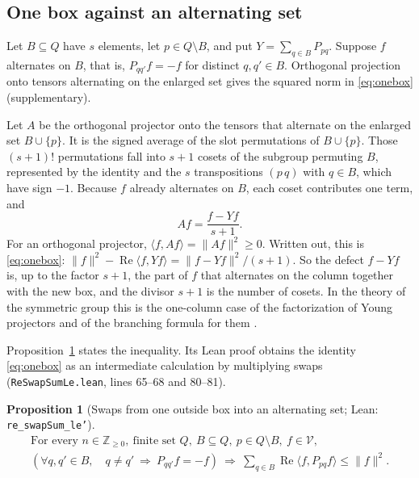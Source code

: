 \documentclass[11pt]{amsart}
\newcommand{\lean}[1]{\texttt{#1}}
\newcommand{\notlean}{supplementary}
\newtheorem{proposition}{Proposition}
\theoremstyle{definition}
\theoremstyle{remark}
\begin{document}
\subsection{One box against an alternating set}\label{sec:onebox}

Let \(B\subseteq Q\) have \(s\) elements, let \(p\in Q\setminus B\), and put
\(Y=\sum_{q\in B}P_{pq}\). Suppose \(f\) alternates on \(B\), that is,
\(P_{qq'}f=-f\) for distinct \(q,q'\in B\). Orthogonal projection onto tensors alternating on the enlarged set
gives the squared norm in \eqref{eq:onebox} (\notlean).

Let \(A\) be the orthogonal projector onto the tensors that alternate on the
enlarged set \(B\cup\{p\}\). It is the signed average of the slot
permutations of \(B\cup\{p\}\). Those \((s+1)!\) permutations fall into
\(s+1\) cosets of the subgroup permuting \(B\), represented by the identity
and the \(s\) transpositions \((p\,q)\) with \(q\in B\), which have sign
\(-1\). Because \(f\) already alternates on \(B\), each coset contributes one
term, and
\[
Af=\frac{f-Yf}{s+1}.
\]
For an orthogonal projector, \(\langle f,Af\rangle=\|Af\|^2\ge0\). Written
out, this is \eqref{eq:onebox}:
\(\|f\|^2-\operatorname{Re}\langle f,Yf\rangle=\|f-Yf\|^2/(s+1)\). So the
defect \(f-Yf\) is, up to the factor \(s+1\), the part of \(f\) that
alternates on the column together with the new box, and the divisor \(s+1\)
is the number of cosets. In the theory of the symmetric group this is the
one-column case of the factorization of Young projectors
\cite[(3)]{Jucys} and of the branching formula for them
\cite[\S 2, (7)--(9)]{Molev}.

Proposition~\ref{prop:3} states the inequality. Its Lean proof obtains the
identity \eqref{eq:onebox} as an intermediate calculation by multiplying
swaps (\lean{ReSwapSumLe.lean}, lines 65--68 and 80--81).

\begin{proposition}[Swaps from one outside box into an alternating set; Lean: \lean{re\_\allowbreak{}swapSum\_\allowbreak{}le'}]\label{prop:3}
\[
\begin{gathered}
\text{For every }n\in\mathbb Z_{\ge0},\ \text{finite set }Q,\
B\subseteq Q,\ p\in Q\setminus B,\ f\in\mathcal V,\\
\left(\forall q,q'\in B,\quad q\ne q'\ \Longrightarrow\ P_{qq'}f=-f\right)
\ \Longrightarrow\
\sum_{q\in B}\operatorname{Re}\langle f,P_{pq}f\rangle\le\|f\|^2.
\end{gathered}
\]
\end{proposition}
\end{document}
